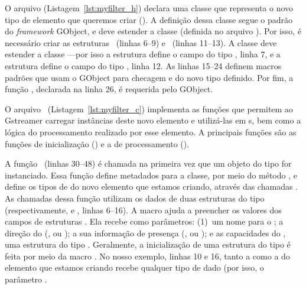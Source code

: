 O arquivo  (Listagem~\ref{lst:myfilter_h}) declara uma classe que
representa o novo tipo de elemento que queremos criar ().  A
definição dessa classe segue o padrão do \emph{framework} GObject, e deve
estender a classe  (definida no arquivo ).  Por
isso, é necessário criar as estruturas ~(linhas 6--9) e
~(linhas 11--13).  A classe  deve estender
a classe ---por isso a estrutura  define o campo
 do tipo , linha 7, e a estrutura
 define o campo  do tipo
, linha 12.  As linhas 15--24 definem macros padrões que
usam o  GObject para checagem e  do novo tipo
definido.  Por fim, a função , declarada na linha 26,
é requerida pelo  GObject.



O arquivo ~(Listagem~\ref{lst:myfilter_c}) implementa as funções
que permitem ao Gstreamer carregar instâncias deste novo elemento e utilizá-las
em s, bem como a lógica do processamento realizado por esse
elemento.  A principais funções são as funções de inicialização () e
a de processamento ().

A função ~(linhas 30--48) é chamada na primeira vez
que um objeto do tipo  for instanciado.  Essa função define
metadados para a classe, por meio do método ,
e define os tipos de  do novo elemento que estamos criando, através
das chamadas .  As chamadas dessa função
utilizam os dados de duas estruturas do tipo 
(respectivamente,  e , linhas 6--16).  A macro
 ajuda a preencher os valores dos campos de
estruturas .  Ela recebe como parâmetros: (1)~um nome
para o ; a direção do  (,
 ou ); a sua informação de presença
(,  ou ); e as
capacidades do , uma estrutura do tipo .  Geralmente, a
inicialização de uma estrutura do tipo  é feita por meio da macro
.  No nosso exemplo, linhas 10 e 16, tanto a 
como a  do elemento que estamos criando recebe qualquer tipo de
dado (por isso, o parâmetro .

